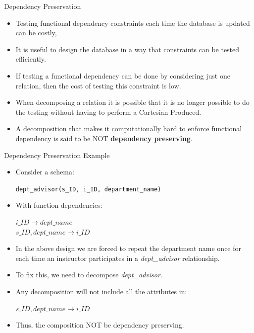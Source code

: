 \documentclass{beamer}
\begin{document}
\begin{frame}{Dependency Preservation}
    \begin{itemize}
        \item Testing functional dependency constraints each time the database is updated can be costly,
        \item It is useful to design the database in a way that constraints can be tested efficiently.
        \item If testing a functional dependency can be done by considering just one relation, then the cost of testing this constraint is low.
        \item When decomposing a relation it is possible that it is no longer possible to do the testing without having to perform a Cartesian Produced.
        \item A decomposition that makes it computationally hard to enforce functional dependency is said to be NOT \textbf{dependency preserving}.
    \end{itemize}
\end{frame}

\begin{frame}{Dependency Preservation Example}
    \begin{itemize}
        \item Consider a schema:
            \begin{center}
                \texttt{dept\_advisor(s\_ID, i\_ID, department\_name)}
            \end{center}
        \item With function dependencies:
            \begin{center}
                $i\_ID \rightarrow dept\_name$ \\
                $s\_ID, dept\_name \rightarrow i\_ID$
            \end{center}
        \item In the above design we are forced to repeat the department name once for each time an instructor participates in a \textit{dept\_advisor} relationship.
        \item To fix this, we need to decompose \textit{dept\_advisor}.
        \item Any decomposition will not include all the attributes in:
            \begin{center}
                $s\_ID, dept\_name \rightarrow i\_ID$
            \end{center}
        \item Thus, the composition NOT be dependency preserving.
    \end{itemize}
\end{frame}
\end{document}
